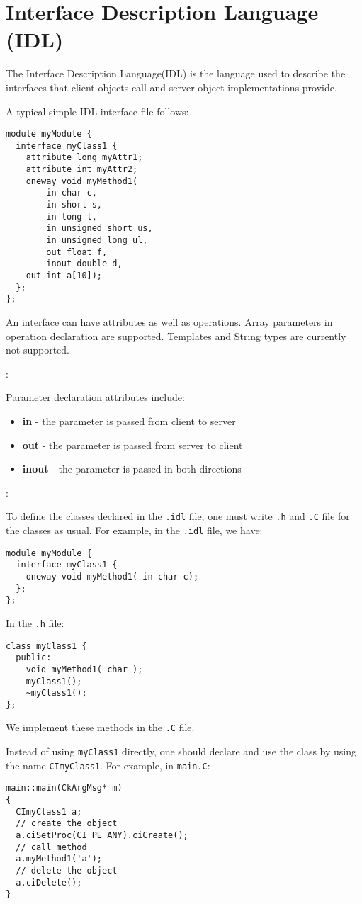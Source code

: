 \section{Interface Description Language (IDL)}

The Interface Description Language(IDL) is the language used to
describe the interfaces that client objects call and server object
implementations provide.

A typical simple IDL interface file follows:

\begin{verbatim}
module myModule {
  interface myClass1 {
    attribute long myAttr1;
    attribute int myAttr2;
    oneway void myMethod1(
        in char c,
        in short s,
        in long l,
        in unsigned short us,
        in unsigned long ul,
        out float f,
        inout double d,
 	out int a[10]);
  };
};
\end{verbatim}

An interface can have attributes as well as operations.  Array
parameters in operation declaration are supported. Templates and String
types are currently not supported.

:

Parameter declaration attributes include:
\begin{itemize}
\item {\bf in} - the parameter is passed from client to server
\item {\bf out} - the parameter is passed from server to client
\item {\bf inout} - the parameter is passed in both directions
\end{itemize}

:

To define the classes declared in the {\tt .idl} file, one must write
{\tt .h} and {\tt .C} file for the classes as usual. For example, in the
{\tt .idl} file, we have:

\begin{verbatim}
module myModule {
  interface myClass1 {
    oneway void myMethod1( in char c);
  };
};
\end{verbatim}

In the  {\tt .h} file:

\begin{verbatim}
class myClass1 {
  public:
    void myMethod1( char );
    myClass1();
    ~myClass1();
};
\end{verbatim}

We implement these methods in the {\tt .C} file.

Instead of using {\tt myClass1} directly, one should declare and use the
class by using the name {\tt CImyClass1}. For example, in {\tt main.C}: 

\begin{verbatim}
main::main(CkArgMsg* m)
{
  CImyClass1 a;
  // create the object
  a.ciSetProc(CI_PE_ANY).ciCreate();
  // call method
  a.myMethod1('a');
  // delete the object
  a.ciDelete();
}
\end{verbatim}

